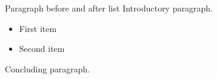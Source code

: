 \documentclass[14pt,t]{beamer}
\begin{document}
\begin{frame}{Paragraph before and after list}
Introductory paragraph.

\begin{itemize}
\item First item
\item Second item
\end{itemize}

Concluding paragraph.
\end{frame}
\end{document}
